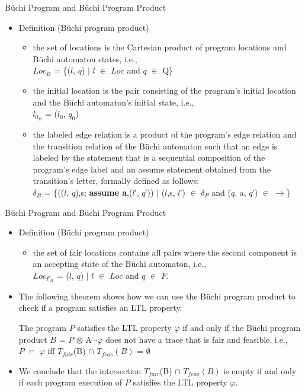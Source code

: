 \documentclass[12pt]{beamer}
\begin{document}
\begin{frame}{B\"uchi Program and B\"uchi Program Product}
  	\begin{itemize}
		\item Definition (B\"uchi program product)
		\begin{itemize}
			\item the set of locations is the Cartesian product of program locations and B\"uchi automaton states, i.e.,\\
			$Loc_{B}$ = \{($l$, $q$) $\mid$ $l$ $\in$ $Loc$ and $q$ $\in$ Q\}
			\item the initial location is the pair consisting of the program’s initial location and the B\"uchi automaton’s initial state, i.e.,\\
			$l_{{0}_{B}}$ = ($l_{0}$, $q_{0}$)
			\item the labeled edge relation is a product of the program’s edge relation and the transition relation of the B\"uchi automaton such that an edge is labeled by the statement that is a sequential composition of the program’s edge label and an assume statement obtained from the transition’s letter, formally defined as follows:\\
			 $\delta_{B}$ = \{(($l$, $q$),s; \textbf{assume a},($l$′, $q$′)) $\mid$ ($l$,s, $l$′) $\in$ $\delta_{P}$ and ($q$, a, $q$′) $\in$ $\rightarrow$\}
		\end{itemize}
  	\end{itemize}
\end{frame}

\begin{frame}{B\"uchi Program and B\"uchi Program Product}
  	\begin{itemize}
		\item Definition (B\"uchi program product)
		\begin{itemize}
			\item the set of fair locations contains all pairs where the second component is an accepting state of the B\"uchi automaton, i.e., \\ $Loc_{{F}_{B}}$ = {($l$, $q$) $\mid$ $l$ $\in$ $Loc$ and $q$ $\in$ $F$}.
		\end{itemize}
		\item The following theorem shows how we can use the B\"uchi program product to check if a program satisfies an LTL property.
		\begin{theorem}
			The program $P$ satisfies the LTL property $\varphi$ if and only if the Büchi program product $B$ = $P$ $\otimes$ A$\neg\varphi$  does not have a trace that is fair and feasible, i.e.,\\
			$P$ $\models$ $\varphi$ iff $T_{fair}$(B) $\cap$ $T_{feas}(B)$ = $\emptyset$
		\end{theorem}
		\item We conclude that the intersection $T_{fair}$(B) $\cap$ $T_{feas}(B)$ is empty if and only if each program execution of $P$ satisfies the LTL property $\varphi$.
  	\end{itemize}
\end{frame}
\end{document}
